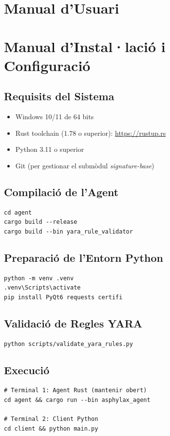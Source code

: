 \documentclass[12pt,a4paper]{report}
\begin{document}
\section{Manual d'Usuari}

\section{Manual d'Instal·lació i Configuració}

\subsection{Requisits del Sistema}
\begin{itemize}
    \item Windows 10/11 de 64 bits
    \item Rust toolchain (1.78 o superior): \url{https://rustup.rs}
    \item Python 3.11 o superior
    \item Git (per gestionar el submòdul \textit{signature-base})
\end{itemize}

\subsection{Compilació de l'Agent}
\begin{lstlisting}[language={},caption={Compilació de l'agent Rust}]
cd agent
cargo build --release
cargo build --bin yara_rule_validator
\end{lstlisting}

\subsection{Preparació de l'Entorn Python}
\begin{lstlisting}[language={},caption={Configuració de l'entorn Python}]
python -m venv .venv
.venv\Scripts\activate
pip install PyQt6 requests certifi
\end{lstlisting}

\subsection{Validació de Regles YARA}
\begin{lstlisting}[language={},caption={Validació i preparació de les regles YARA}]
python scripts/validate_yara_rules.py
\end{lstlisting}

\subsection{Execució}
\begin{lstlisting}[language={},caption={Execució del sistema}]
# Terminal 1: Agent Rust (mantenir obert)
cd agent && cargo run --bin asphylax_agent

# Terminal 2: Client Python
cd client && python main.py
\end{lstlisting}
\end{document}
